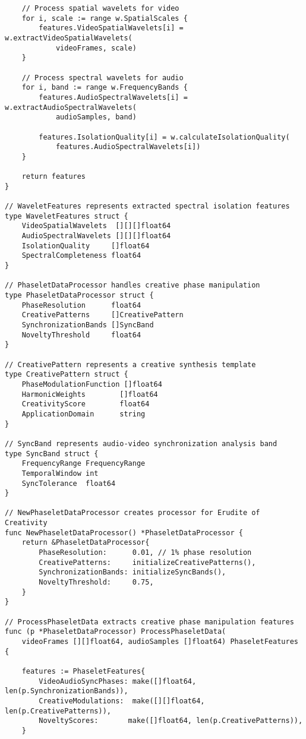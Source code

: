 \begin{tcolorbox}[colback=CodeBackground, colframe=DarkGray, title=Video-Audio Dataset Processing, fonttitle=\bfseries]
\begin{verbatim}
    // Process spatial wavelets for video
    for i, scale := range w.SpatialScales {
        features.VideoSpatialWavelets[i] = w.extractVideoSpatialWavelets(
            videoFrames, scale)
    }
    
    // Process spectral wavelets for audio
    for i, band := range w.FrequencyBands {
        features.AudioSpectralWavelets[i] = w.extractAudioSpectralWavelets(
            audioSamples, band)
        
        features.IsolationQuality[i] = w.calculateIsolationQuality(
            features.AudioSpectralWavelets[i])
    }
    
    return features
}

// WaveletFeatures represents extracted spectral isolation features
type WaveletFeatures struct {
    VideoSpatialWavelets  [][][]float64
    AudioSpectralWavelets [][][]float64
    IsolationQuality     []float64
    SpectralCompleteness float64
}

// PhaseletDataProcessor handles creative phase manipulation
type PhaseletDataProcessor struct {
    PhaseResolution      float64
    CreativePatterns     []CreativePattern
    SynchronizationBands []SyncBand
    NoveltyThreshold     float64
}

// CreativePattern represents a creative synthesis template
type CreativePattern struct {
    PhaseModulationFunction []float64
    HarmonicWeights        []float64
    CreativityScore        float64
    ApplicationDomain      string
}

// SyncBand represents audio-video synchronization analysis band
type SyncBand struct {
    FrequencyRange FrequencyRange
    TemporalWindow int
    SyncTolerance  float64
}

// NewPhaseletDataProcessor creates processor for Erudite of Creativity
func NewPhaseletDataProcessor() *PhaseletDataProcessor {
    return &PhaseletDataProcessor{
        PhaseResolution:      0.01, // 1% phase resolution
        CreativePatterns:     initializeCreativePatterns(),
        SynchronizationBands: initializeSyncBands(),
        NoveltyThreshold:     0.75,
    }
}

// ProcessPhaseletData extracts creative phase manipulation features
func (p *PhaseletDataProcessor) ProcessPhaseletData(
    videoFrames [][]float64, audioSamples []float64) PhaseletFeatures {
    
    features := PhaseletFeatures{
        VideoAudioSyncPhases: make([]float64, len(p.SynchronizationBands)),
        CreativeModulations:  make([][]float64, len(p.CreativePatterns)),
        NoveltyScores:       make([]float64, len(p.CreativePatterns)),
    }
    

\end{verbatim}
\end{tcolorbox}
